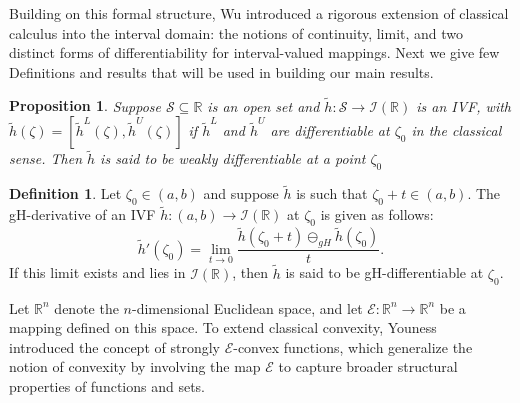 \documentclass[12pt, reqno]{amsart}
\newtheorem{proposition}{Proposition}[section]
\theoremstyle{definition}
\newtheorem{definition}{Definition}[section]
\theoremstyle{remark}
\numberwithin{equation}{section}
\begin{document}
 Building on this formal structure, Wu \cite{Wu2007} introduced a rigorous extension of classical calculus into the interval domain: the notions of continuity, limit, and two distinct forms of differentiability for interval-valued mappings. Next we give few Definitions and results that will be used in building our main results.





\begin{proposition} \cite{Wu2007} Suppose $\mathcal{S} \subseteq \mathbb{R}$ is an open set and $\tilde{h}: \mathcal{S} \rightarrow \mathcal{I}(\mathbb{R})$ is an IVF, with $\tilde{h}(\mathit{\zeta} ) = [\tilde{h}^L(\mathit{\zeta} ), \tilde{h}^U(\mathit{\zeta} )]$ if  $\tilde{h}^L$ and $\tilde{h}^U$ are differentiable at $\mathit{\zeta} _0$ in the classical sense. Then  $\tilde{h} $ is said to be weakly differentiable at a point $\mathit{\zeta} _0$
\end{proposition}
\vspace{0.2cm}


\begin{definition}\cite{Stefanini2009}
Let $\mathit{\zeta} _0 \in (a, b)$ and suppose $\tilde{h} $ is such that $\mathit{\zeta} _0 + t \in (a, b)$. The gH-derivative of an IVF $\tilde{h} : (a, b) \to \mathcal{I}(\mathbb{R})$ at $\mathit{\zeta} _0$ is given as follows:
\begin{equation*}
    \tilde{h}'(\mathit{\zeta} _0) = \lim_{t \to 0} \frac{\tilde{h}(\mathit{\zeta} _0 + t) \ominus_{gH}\tilde{h}(\mathit{\zeta} _0)}{t}.
\end{equation*}
If this limit exists and lies in $\mathcal{I}(\mathbb{R})$, then $\tilde{h} $ is said to be gH-differentiable at $\mathit{\zeta} _0$.
\end{definition}
 
Let $\mathbb{R}^n$ denote the $n$-dimensional Euclidean space, and let $\mathcal{E}: \mathbb{R}^n \rightarrow \mathbb{R}^n$ be a mapping defined on this space. To extend classical convexity, Youness~\cite{Youness2013} introduced the concept of strongly $\mathcal{E}$-convex functions, which generalize the notion of convexity by involving the map $\mathcal{E}$ to capture broader structural properties of functions and sets.
 
\end{document}
